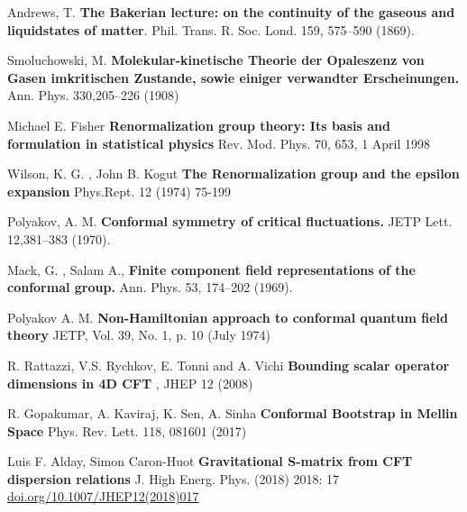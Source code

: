 \documentclass[12pt,a4paper,oneside]{book}
\theoremstyle{definition}
\begin{document}
            \begin{thebibliography}{99}
                Andrews, T. 
                \newblock \textbf{The Bakerian lecture: on the continuity of the gaseous and    liquidstates of matter}. Phil. Trans. R. Soc. Lond. 159, 575–590 (1869).

                Smoluchowski, M. 
                \newblock \textbf{Molekular-kinetische Theorie der Opaleszenz von Gasen imkritischen Zustande, sowie einiger verwandter Erscheinungen.} Ann. Phys. 330,205–226 (1908)

                Michael E. Fisher
                \textbf{Renormalization group theory: Its basis and formulation in statistical physics}
                Rev. Mod. Phys. 70, 653, 1 April 1998
                
                Wilson, K. G. , John B. Kogut
                \textbf{The Renormalization group and the epsilon expansion}
                Phys.Rept. 12 (1974) 75-199

                Polyakov, A. M. 
                \textbf{Conformal symmetry of critical fluctuations.} JETP Lett. 12,381–383 (1970). 

                Mack, G. , Salam A., 
                \textbf{Finite component field representations of the conformal group.} Ann. Phys. 53, 174–202 (1969).

                Polyakov A. M.
                \textbf{Non-Hamiltonian approach to conformal quantum field theory }
                JETP, Vol. 39, No. 1, p. 10 (July 1974)

                R. Rattazzi, V.S. Rychkov, E. Tonni and A. Vichi
                \textbf{Bounding scalar operator dimensions in 4D CFT}
                , JHEP 12 (2008)

                R. Gopakumar, A. Kaviraj, K. Sen, A. Sinha
                \textbf{Conformal Bootstrap in Mellin Space}
                Phys. Rev. Lett. 118, 081601 (2017)

                Luis F. Alday, Simon Caron-Huot
                \textbf{Gravitational S-matrix from CFT dispersion relations}
                J. High Energ. Phys. (2018) 2018: 17 \href{https://doi.org/10.1007/JHEP12(2018)017}{doi.org/10.1007/JHEP12(2018)017}


\end{thebibliography}
\end{document}
